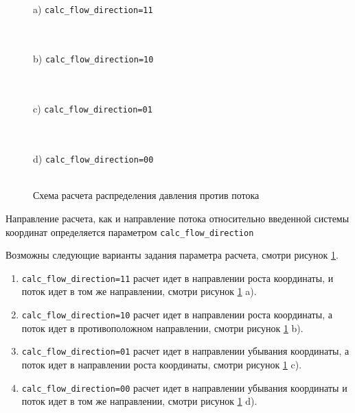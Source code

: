 \begin{figure}[h!]
	\begin{minipage}[h]{0.47\linewidth}
		\center{}  \\a) \texttt{calc_flow_direction=11}\\ \ 
	\end{minipage}
	\hfill
	\begin{minipage}[h]{0.47\linewidth}
		\center{} \\b) \texttt{calc_flow_direction=10}\\ \ 
	\end{minipage}
	\vfill
	\begin{minipage}[h]{0.47\linewidth}
		\center{}  \\c) \texttt{calc_flow_direction=01}\\ \ 
	\end{minipage}
	\hfill
	\begin{minipage}[h]{0.47\linewidth}
		\center{}  \\d) \texttt{calc_flow_direction=00}\\ \ 
	\end{minipage}
	\caption{Схема расчета распределения давления против потока}
	\label{ris:Pipe_scheme_1_4}
\end{figure}


Направление расчета, как и направление потока относительно введенной системы координат определяется параметром  \texttt{calc_flow_direction} 

Возможны следующие варианты задания параметра расчета, смотри рисунок \ref{ris:Pipe_scheme_1_4}.
\begin{enumerate}
	\item  \texttt{calc_flow_direction=11} расчет идет в направлении роста координаты, и поток идет в том же направлении, смотри рисунок \ref{ris:Pipe_scheme_1_4} a).
	
	\item  \texttt{calc_flow_direction=10} расчет идет в направлении роста координаты, а поток идет в противоположном направлении, смотри рисунок \ref{ris:Pipe_scheme_1_4} b).
	
	\item  \texttt{calc_flow_direction=01} расчет идет в направлении убывания координаты, а поток идет в направлении роста координаты, смотри рисунок \ref{ris:Pipe_scheme_1_4} c).
	
	\item  \texttt{calc_flow_direction=00} расчет идет в направлении убывания координаты и поток идет в том же направлении, смотри рисунок \ref{ris:Pipe_scheme_1_4} d).
\end{enumerate}

